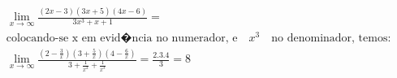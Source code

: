 \begin{ex}
\begin{align}
&\lim_{x\rightarrow \infty} \frac{(2x-3)(3x+5)(4x-6)}{3x^3+x+1}=\nonumber\\
&\text{colocando-se x em evid�ncia no numerador, e}\quad x^3\quad\text{no denominador, temos:}\nonumber\\
&\lim_{x\rightarrow \infty} \frac{\left(2-\frac{3}{x}\right)\left(3+\frac{5}{x}\right)\left(4-\frac{6}{x}\right)}{3+\frac{1}{x^2}+\frac{1}{x^3}}=\frac{2.3.4}{3}=8\nonumber
\end{align}
\end{ex}
